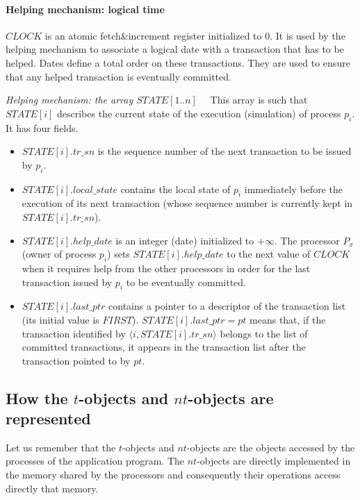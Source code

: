 \paragraph{Helping mechanism: logical time}
$\mathit{CLOCK}$ is an atomic fetch\&increment register initialized 
to $0$.  It is used by the  helping mechanism to associate a logical date
with a  transaction that has to be  helped. Dates define a total  order 
on these transactions. They are used to ensure 
that any helped  transaction is  eventually  committed. 



\noindent
{\it Helping mechanism: the array $\mathit{STATE}[1..n]$}~~
This array  is  such that $\mathit{STATE}[i]$ describes the current state 
of the execution (simulation)  of process $p_i$. It has four fields.  
\begin{itemize}
\item  
$\mathit{STATE}[i].tr\_sn$ is the sequence number of 
the next  transaction to be issued by $p_i$. 
%
\item  $\mathit{STATE}[i].local\_state$ contains the local state of $p_i$
immediately before the execution of its next transaction (whose sequence 
number is currently  kept  in $\mathit{STATE}[i].tr\_sn$). 
%
\item 
$\mathit{STATE}[i].help\_date$ is an integer (date) initialized to $+\infty$. 
The processor $P_x$ (owner of process $p_i$) sets 
$\mathit{STATE}[i].help\_date$ to  the next value  of $\mathit{CLOCK}$ when
it requires help from  the other processors  in order for the last transaction 
issued by $p_i$ to be eventually committed. 
%
\item  $\mathit{STATE}[i].last\_ptr$ contains a pointer to a
descriptor of the transaction list (its initial value is  $\mathit{FIRST}$). 
$\mathit{STATE}[i].last\_ptr=pt$  means that, if 
the transaction identified by  $\langle i,\mathit{STATE}[i].tr\_sn\rangle$ 
belongs  to  the  list  of  committed  transactions,  it appears in the transaction list after  the
transaction pointed to by $pt$.  
\end{itemize}

\subsection{How  the $t$-objects and $nt$-objects are represented}
Let us remember that the $t$-objects  and  $nt$-objects are the objects 
accessed by  the processes of the application program.  
The $nt$-objects are directly implemented in the  memory shared by the 
processors and consequently their operations access directly that memory.  

